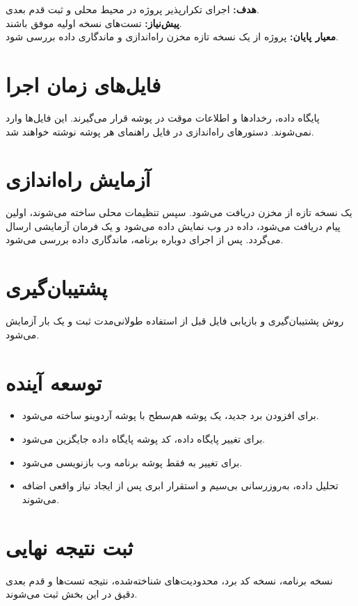 \begin{phasebox}
\textbf{هدف:} اجرای تکرارپذیر پروژه در محیط محلی و ثبت قدم بعدی.\\
\textbf{پیش‌نیاز:} تست‌های نسخه اولیه موفق باشند.\\
\textbf{معیار پایان:} پروژه از یک نسخه تازه مخزن راه‌اندازی و ماندگاری داده بررسی شود.
\end{phasebox}

\section{فایل‌های زمان اجرا}
پایگاه داده، رخدادها و اطلاعات موقت در پوشه
قرار می‌گیرند. این فایل‌ها وارد
نمی‌شوند. دستورهای راه‌اندازی در فایل راهنمای هر پوشه نوشته خواهند شد.

\section{آزمایش راه‌اندازی}
یک نسخه تازه از مخزن دریافت می‌شود. سپس تنظیمات محلی ساخته می‌شوند، اولین پیام دریافت می‌شود، داده در وب نمایش داده می‌شود و یک فرمان آزمایشی ارسال می‌گردد. پس از اجرای دوباره برنامه، ماندگاری داده بررسی می‌شود.

\section{پشتیبان‌گیری}
روش پشتیبان‌گیری و بازیابی فایل
قبل از استفاده طولانی‌مدت ثبت و یک بار آزمایش می‌شود.

\section{توسعه آینده}
\begin{itemize}
    \item برای افزودن برد جدید، یک پوشه هم‌سطح با پوشه آردوینو ساخته می‌شود.
    \item برای تغییر پایگاه داده، کد پوشه پایگاه داده جایگزین می‌شود.
    \item برای تغییر
    به
    فقط پوشه برنامه وب بازنویسی می‌شود.
    \item تحلیل داده، به‌روزرسانی بی‌سیم و استقرار ابری پس از ایجاد نیاز واقعی اضافه می‌شوند.
\end{itemize}

\section{ثبت نتیجه نهایی}
نسخه برنامه، نسخه کد برد، محدودیت‌های شناخته‌شده، نتیجه تست‌ها و قدم بعدی دقیق در این بخش ثبت می‌شوند.
